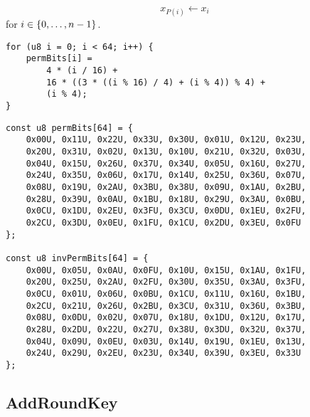\[
x_{P(i)}\gets x_i
\] for $i\in\set{0,\dots,n-1}$.
\vspace{8pt}
\begin{lstlisting}[style=C]
for (u8 i = 0; i < 64; i++) {
	permBits[i] =
		4 * (i / 16) +
		16 * ((3 * ((i % 16) / 4) + (i % 4)) % 4) +
		(i % 4);
}
\end{lstlisting}
\begin{table}[h]
	\caption{Specifications of $\gift$-$64$ Bit Permutation}
	\label{table:gift-64-permbit}
\end{table}

\begin{lstlisting}[style=C]
const u8 permBits[64] = {
	0x00U, 0x11U, 0x22U, 0x33U, 0x30U, 0x01U, 0x12U, 0x23U, 
	0x20U, 0x31U, 0x02U, 0x13U, 0x10U, 0x21U, 0x32U, 0x03U, 
	0x04U, 0x15U, 0x26U, 0x37U, 0x34U, 0x05U, 0x16U, 0x27U, 
	0x24U, 0x35U, 0x06U, 0x17U, 0x14U, 0x25U, 0x36U, 0x07U, 
	0x08U, 0x19U, 0x2AU, 0x3BU, 0x38U, 0x09U, 0x1AU, 0x2BU, 
	0x28U, 0x39U, 0x0AU, 0x1BU, 0x18U, 0x29U, 0x3AU, 0x0BU, 
	0x0CU, 0x1DU, 0x2EU, 0x3FU, 0x3CU, 0x0DU, 0x1EU, 0x2FU, 
	0x2CU, 0x3DU, 0x0EU, 0x1FU, 0x1CU, 0x2DU, 0x3EU, 0x0FU
};

const u8 invPermBits[64] = {
	0x00U, 0x05U, 0x0AU, 0x0FU, 0x10U, 0x15U, 0x1AU, 0x1FU, 
	0x20U, 0x25U, 0x2AU, 0x2FU, 0x30U, 0x35U, 0x3AU, 0x3FU, 
	0x0CU, 0x01U, 0x06U, 0x0BU, 0x1CU, 0x11U, 0x16U, 0x1BU, 
	0x2CU, 0x21U, 0x26U, 0x2BU, 0x3CU, 0x31U, 0x36U, 0x3BU, 
	0x08U, 0x0DU, 0x02U, 0x07U, 0x18U, 0x1DU, 0x12U, 0x17U, 
	0x28U, 0x2DU, 0x22U, 0x27U, 0x38U, 0x3DU, 0x32U, 0x37U, 
	0x04U, 0x09U, 0x0EU, 0x03U, 0x14U, 0x19U, 0x1EU, 0x13U, 
	0x24U, 0x29U, 0x2EU, 0x23U, 0x34U, 0x39U, 0x3EU, 0x33U
};
\end{lstlisting}

\subsection{AddRoundKey}